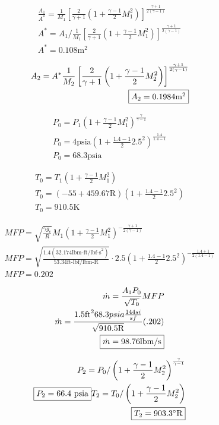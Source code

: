 \begin{align*}
    \frac{A_1}{A^*}=\frac{1}{M_1}\left[\frac{2}{\gamma+1}\left(1+\frac{\gamma-1}{2}M_1^2
    \right)\right]^{\frac{\gamma+1}{2(\gamma-1)}} \\
    A^*=A_1/\frac{1}{M_1}\left[\frac{2}{\gamma+1}\left(1+\frac{\gamma-1}{2}M_1^2
    \right)\right]^{\frac{\gamma+1}{2(\gamma-1)}} \\
    A^*=0.108\text{m}^2
\end{align*}

\begin{align*}
    A_2=A^*\frac{1}{M_2}\left[\frac{2}{\gamma+1}\left(1+\frac{\gamma-1}{2}M_2^2
    \right)\right]^{\frac{\gamma+1}{2(\gamma-1)}} \\
    \fbox{$A_2=0.1984$m$^2$}
\end{align*}


\begin{align*}
    P_0=P_1\left(1+\frac{\gamma-1}{2}M_1^2\right)^\frac{\gamma}{\gamma-1} \\
    P_0=4\text{psia}\left(1+\frac{1.4-1}{2}2.5^2\right)^\frac{1.4}{1.4-1} \\
    P_0=68.3\text{psia}
\end{align*}

\begin{align*}
    T_0=T_1\left(1+\frac{\gamma-1}{2}M_1^2\right) \\
    T_0=(-55+459.67\text{R})\left(1+\frac{1.4-1}{2}2.5^2\right) \\
    T_0=910.5\text{K}
\end{align*}

\begin{align*}
    MFP=\sqrt{\frac{\gamma g_c}{R}}M_1\left(1+\frac{\gamma-1}{2}M_1^2\right)^
    {-\frac{\gamma+1}{2(\gamma-1)}} \\
    MFP=\sqrt{\frac{1.4(32.174\text{lbm-ft/lbf-s}^2)}{53.34\text{ft-lbf/lbm-R}}}\cdot 2.5\left(
    1+\frac{1.4-1}{2}2.5^2\right)^{-\frac{1.4+1}{2(1.4-1)}} \\
    MFP=0.202
\end{align*}

\begin{align*}
    \dot{m}=\frac{A_1P_0}{\sqrt{T_0}}MFP \\
    \dot{m}=\frac{1.5\text{ft}^268.3psia\frac{144si}{sf}}{\sqrt{910.5\text{R}}}(.202) \\
    \fbox{$\dot{m}=98.76$lbm/s}
\end{align*}

\begin{align*}
    P_2=P_0/\left(1+\frac{\gamma-1}{2}M_2^2\right)^\frac{\gamma}{\gamma-1} \\
    \fbox{$P_2=66.4$ psia}
    T_2=T_0/\left(1+\frac{\gamma-1}{2}M_2^2\right) \\
    \fbox{$T_2=903.3^\circ$R}
\end{align*}

